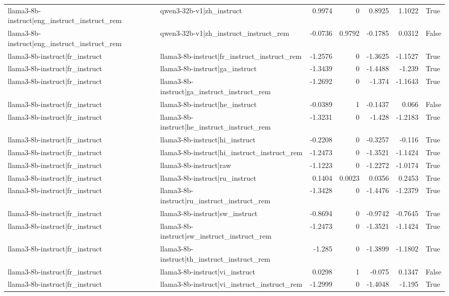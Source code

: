\begin{table}
\begin{tabular}{l l r r r r l}
llama3-8b-instruct|eng_instruct_instruct_rem & qwen3-32b-v1|zh_instruct & 0.9974 & 0 & 0.8925 & 1.1022 & True \\
llama3-8b-instruct|eng_instruct_instruct_rem & qwen3-32b-v1|zh_instruct_instruct_rem & -0.0736 & 0.9792 & -0.1785 & 0.0312 & False \\
llama3-8b-instruct|fr_instruct & llama3-8b-instruct|fr_instruct_instruct_rem & -1.2576 & 0 & -1.3625 & -1.1527 & True \\
llama3-8b-instruct|fr_instruct & llama3-8b-instruct|ga_instruct & -1.3439 & 0 & -1.4488 & -1.239 & True \\
llama3-8b-instruct|fr_instruct & llama3-8b-instruct|ga_instruct_instruct_rem & -1.2692 & 0 & -1.374 & -1.1643 & True \\
llama3-8b-instruct|fr_instruct & llama3-8b-instruct|he_instruct & -0.0389 & 1 & -0.1437 & 0.066 & False \\
llama3-8b-instruct|fr_instruct & llama3-8b-instruct|he_instruct_instruct_rem & -1.3231 & 0 & -1.428 & -1.2183 & True \\
llama3-8b-instruct|fr_instruct & llama3-8b-instruct|hi_instruct & -0.2208 & 0 & -0.3257 & -0.116 & True \\
llama3-8b-instruct|fr_instruct & llama3-8b-instruct|hi_instruct_instruct_rem & -1.2473 & 0 & -1.3521 & -1.1424 & True \\
llama3-8b-instruct|fr_instruct & llama3-8b-instruct|raw & -1.1223 & 0 & -1.2272 & -1.0174 & True \\
llama3-8b-instruct|fr_instruct & llama3-8b-instruct|ru_instruct & 0.1404 & 0.0023 & 0.0356 & 0.2453 & True \\
llama3-8b-instruct|fr_instruct & llama3-8b-instruct|ru_instruct_instruct_rem & -1.3428 & 0 & -1.4476 & -1.2379 & True \\
llama3-8b-instruct|fr_instruct & llama3-8b-instruct|sw_instruct & -0.8694 & 0 & -0.9742 & -0.7645 & True \\
llama3-8b-instruct|fr_instruct & llama3-8b-instruct|sw_instruct_instruct_rem & -1.2473 & 0 & -1.3521 & -1.1424 & True \\
llama3-8b-instruct|fr_instruct & llama3-8b-instruct|th_instruct_instruct_rem & -1.285 & 0 & -1.3899 & -1.1802 & True \\
llama3-8b-instruct|fr_instruct & llama3-8b-instruct|vi_instruct & 0.0298 & 1 & -0.075 & 0.1347 & False \\
llama3-8b-instruct|fr_instruct & llama3-8b-instruct|vi_instruct_instruct_rem & -1.2999 & 0 & -1.4048 & -1.195 & True \\

\end{tabular}
\end{table}
